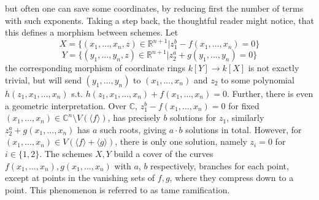 \begin{example}
    but often one can save some coordinates, by reducing first the number of terms with such exponents.
    \newline
    \newline
    Taking a step back, the thoughtful reader might notice, that this defines a morphism between schemes. Let 
    \[ X = \{ (x_1, \dots, x_n, z) \in \mathbb{R}^{n+1} | z_1^b - f(x_1, \dots, x_n) = 0 \} \] 
    \[ Y = \{ (y_1, \dots, y_n, z) \in \mathbb{R}^{n+1} | z_2^a + g(y_1, \dots, y_n) = 0 \} \]
    the corresponding morphism of coordinate rings \( k[Y] \to k[X] \) is not exactly trivial, but will send \( (y_1, \dots, y_n) \) to \( (x_1, \dots, x_n) \) 
    and \( z_2 \) to some polynomial \( h(z_1, x_1, \dots, x_n) \) s.t. \( h(z_1, x_1, \dots, x_n) + f(x_1, \dots, x_n) = 0 \).
    Further, there is even a geometric interpretation. 
    Over \( \mathbb{C} \), \( z_1^b - f(x_1, \dots, x_n) = 0  \) for fixed \( (x_1, \dots, x_n) \in \mathbb{C}^n \setminus V(\langle f \rangle) \), has precisely \( b \)
    solutions for \( z_1 \), similarly \( z_2^a + g(x_1, \dots, x_n) \) has \( a \) such roots, giving \( a \cdot b \) solutions in total.
    However, for \( (x_1, \dots, x_n) \in V(\langle f \rangle + \langle g \rangle) \), there is only one solution, namely \( z_i = 0 \) for \( i \in \{1, 2\} \).
    The schemes \( X, Y \) build a cover of the curves \( f(x_1, \dots, x_n), g(x_1, \dots, x_n) \) with \( a \), \( b \) respectively, branches for each point,
    except at points in the vanishing sets of \( f, g \), where they compress down to a point. This phenomenon is referred to as tame ramification.
\end{example}
